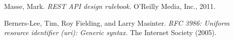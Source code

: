 \documentclass[10pt,a4paper]{scrartcl}
\begin{document}
\pagebreak


\begin{thebibliography}{1}
	Masse, Mark. 
	\emph{REST API design rulebook.} 
	O'Reilly Media, Inc., 2011.
	
	Berners-Lee, Tim, Roy Fielding, and Larry Masinter. 
	\emph{RFC 3986: Uniform resource identifier (uri): Generic syntax.}
	The Internet Society (2005).
		
\end{thebibliography}
\end{document}
